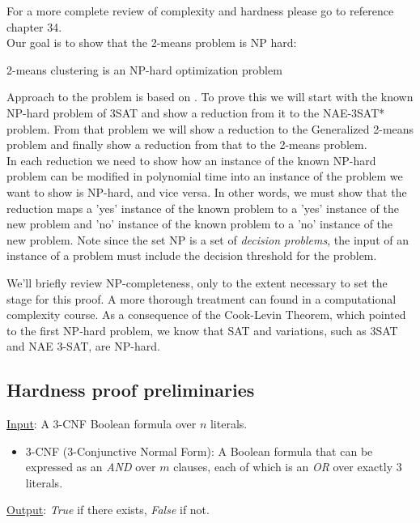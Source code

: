 For a more complete review of complexity and hardness please go to
reference \cite{cor2009} chapter 34. \\

Our goal is to show that the 2-means problem is NP hard:

\begin{theorem}\label{2-means-np-hard}
2-means clustering is an NP-hard optimization problem
\end{theorem} 

Approach to the problem is based on \cite{das2008}.  To prove this we
will start with the known NP-hard problem of 3SAT and show a reduction
from it to the NAE-3SAT* problem.  From that problem we will show a
reduction to the Generalized 2-means problem and finally show a
reduction from that to the 2-means problem. \\

In each reduction  we need to show how an instance of the known NP-hard problem can be modified in polynomial time into an instance of the problem we want
to show is NP-hard, and vice versa. In other words, we must show that the reduction maps a 'yes'
instance of the known problem to a 'yes' instance of the new problem
and 'no' instance of the known problem to a 'no' instance of the new
problem. Note since the set NP is a set of \emph{decision problems}, the
input of an instance of a problem must include the decision threshold
for the problem.

We'll briefly review NP-completeness, only to the extent necessary to
set the stage for this proof.  A more thorough treatment can found in
a computational complexity course. As a consequence of the Cook-Levin
Theorem, which pointed to the first NP-hard problem, we know that SAT
and variations, such as 3SAT and NAE 3-SAT, are NP-hard.

\subsection{Hardness proof preliminaries}
\begin{definition}[3SAT]
\item \underline{Input}:  A 3-CNF Boolean formula over $n$ literals. 
\begin{itemize}
\item 3-CNF (3-Conjunctive Normal Form): A Boolean formula that can be expressed as an \emph{AND} over
  $m$ clauses, each of which is an \emph{OR} over exactly 3 literals.
\end{itemize}
\item \underline{Output}: \emph{True} if there exists, \emph{False} if not.
\end{definition}

